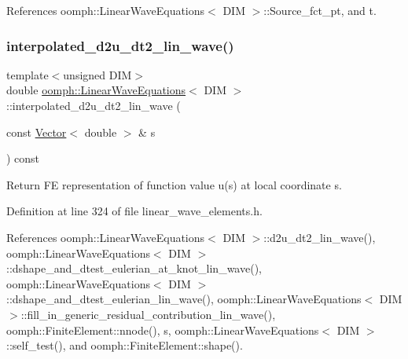References oomph\+::\+Linear\+Wave\+Equations$<$ D\+I\+M $>$\+::\+Source\+\_\+fct\+\_\+pt, and t.

\mbox{\label{classoomph_1_1LinearWaveEquations_a86abe5e3b3473823368cb81f6f749707}} 
\subsubsection{\texorpdfstring{interpolated\+\_\+d2u\+\_\+dt2\+\_\+lin\+\_\+wave()}{interpolated\_d2u\_dt2\_lin\_wave()}}
{\footnotesize\ttfamily template$<$unsigned D\+IM$>$ \\
double \hyperlink{classoomph_1_1LinearWaveEquations}{oomph\+::\+Linear\+Wave\+Equations}$<$ D\+IM $>$\+::interpolated\+\_\+d2u\+\_\+dt2\+\_\+lin\+\_\+wave (\begin{DoxyParamCaption}\item[{const \hyperlink{classoomph_1_1Vector}{Vector}$<$ double $>$ \&}]{s }\end{DoxyParamCaption}) const\hspace{0.3cm}{\ttfamily [inline]}}



Return FE representation of function value u(s) at local coordinate s. 



Definition at line 324 of file linear\+\_\+wave\+\_\+elements.\+h.



References oomph\+::\+Linear\+Wave\+Equations$<$ D\+I\+M $>$\+::d2u\+\_\+dt2\+\_\+lin\+\_\+wave(), oomph\+::\+Linear\+Wave\+Equations$<$ D\+I\+M $>$\+::dshape\+\_\+and\+\_\+dtest\+\_\+eulerian\+\_\+at\+\_\+knot\+\_\+lin\+\_\+wave(), oomph\+::\+Linear\+Wave\+Equations$<$ D\+I\+M $>$\+::dshape\+\_\+and\+\_\+dtest\+\_\+eulerian\+\_\+lin\+\_\+wave(), oomph\+::\+Linear\+Wave\+Equations$<$ D\+I\+M $>$\+::fill\+\_\+in\+\_\+generic\+\_\+residual\+\_\+contribution\+\_\+lin\+\_\+wave(), oomph\+::\+Finite\+Element\+::nnode(), s, oomph\+::\+Linear\+Wave\+Equations$<$ D\+I\+M $>$\+::self\+\_\+test(), and oomph\+::\+Finite\+Element\+::shape().

\mbox{\label{classoomph_1_1LinearWaveEquations_a79c7bb4d574bffa81227fa93bc08fb4b}} 

